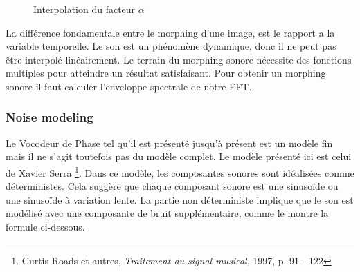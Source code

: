     \begin{figure}
        \caption{Interpolation du facteur $\alpha $}
        \label{alpha_interp}
    \end{figure}
        

La différence fondamentale entre le morphing d’une image, est le rapport a la variable temporelle. Le son est un phénomène dynamique, donc il ne peut pas être interpolé linéairement. Le terrain du morphing sonore nécessite des fonctions multiples pour atteindre un résultat satisfaisant. Pour obtenir un morphing sonore il faut calculer l’enveloppe spectrale de notre FFT.

\subsubsection{Noise modeling}

Le Vocodeur de Phase tel qu'il est présenté jusqu'à présent est un modèle fin mais il ne s'agit toutefois pas du modèle complet. Le modèle présenté ici est celui de Xavier Serra \footnote {Curtis Roads et autres, \textit {Traitement du signal musical}, 1997, p. 91 - 122 \nocite {Roads97}}. Dans ce modèle, les composantes sonores sont idéalisées comme déterministes. Cela suggère que chaque composant sonore est une sinusoïde ou une sinusoïde à variation lente. La partie non déterministe implique que le son est modélisé avec une composante de bruit supplémentaire, comme le montre la formule ci-dessous.

